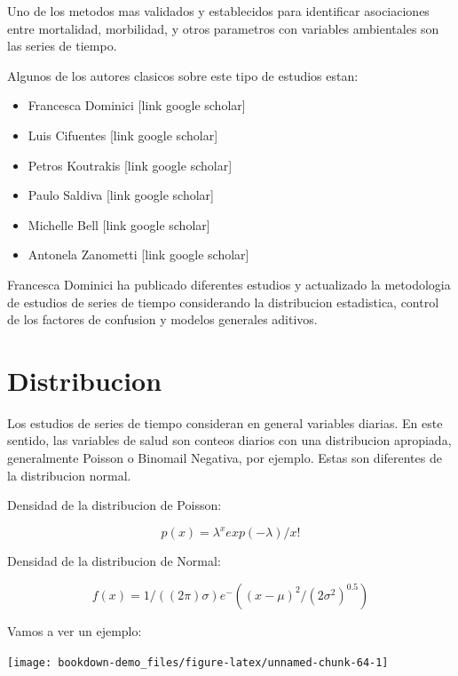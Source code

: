 \documentclass[]{book}
\providecommand{\tightlist}{%
  \setlength{\itemsep}{0pt}\setlength{\parskip}{0pt}}
\begin{document}
Uno de los metodos mas validados y establecidos para identificar asociaciones entre mortalidad, morbilidad, y otros parametros con variables ambientales son las series de tiempo.

Algunos de los autores clasicos sobre este tipo de estudios estan:

\begin{itemize}
\tightlist
\item
  Francesca Dominici {[}link google scholar{]}
\item
  Luis Cifuentes {[}link google scholar{]}
\item
  Petros Koutrakis {[}link google scholar{]}
\item
  Paulo Saldiva {[}link google scholar{]}
\item
  Michelle Bell {[}link google scholar{]}
\item
  Antonela Zanometti {[}link google scholar{]}
\end{itemize}

Francesca Dominici ha publicado diferentes estudios y actualizado la metodologia de estudios de series de tiempo considerando la distribucion estadistica, control de los factores de confusion y modelos generales aditivos.

\hypertarget{distribucion}{%
\section{Distribucion}\label{distribucion}}

Los estudios de series de tiempo consideran en general variables diarias. En este sentido, las variables de salud son conteos diarios con una distribucion apropiada, generalmente Poisson o Binomail Negativa, por ejemplo. Estas son diferentes de la distribucion normal.

Densidad de la distribucion de Poisson:

\begin{equation}
p(x) = \lambda^x exp(-\lambda)/x!
\label{eq:12}
\end{equation}

Densidad de la distribucion de Normal:

\begin{equation}
f(x) = 1/( (2 \pi) \sigma) e^-((x - \mu)^2/(2 \sigma^2)^0.5 )
\label{eq:13}
\end{equation}

Vamos a ver un ejemplo:

\texttt{[image: bookdown-demo\_files/figure-latex/unnamed-chunk-64-1]}
\end{document}
